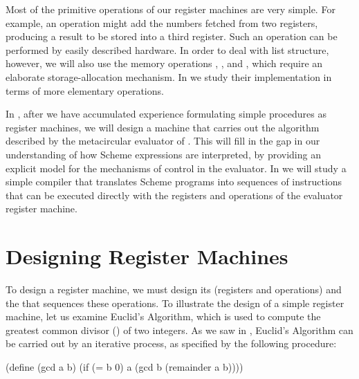 Most of the primitive operations of our register machines are very simple.  For
example, an operation might add the numbers fetched from two registers,
producing a result to be stored into a third register.  Such an operation can
be performed by easily described hardware.  In order to deal with list
structure, however, we will also use the memory operations ,
, and , which require an elaborate storage-allocation
mechanism.  In  we study their implementation in terms of more
elementary operations.

In , after we have accumulated experience formulating simple
procedures as register machines, we will design a machine that carries out the
algorithm described by the metacircular evaluator of .  This
will fill in the gap in our understanding of how Scheme expressions are
interpreted, by providing an explicit model for the mechanisms of control in
the evaluator.  In  we will study a simple compiler that
translates Scheme programs into sequences of instructions that can be executed
directly with the registers and operations of the evaluator register machine.



\section{Designing Register Machines}
\label{Section 5.1}

To design a register machine, we must design its 
(registers and operations) and the  that sequences these
operations.  To illustrate the design of a simple register machine, let us
examine Euclid's Algorithm, which is used to compute the greatest common
divisor () of two integers.  As we saw in ,
Euclid's Algorithm can be carried out by an iterative process, as specified by
the following procedure:

\begin{codeBlock}

(define (gcd a b)
  (if (= b 0)
      a
      (gcd b (remainder a b))))
\end{codeBlock}

